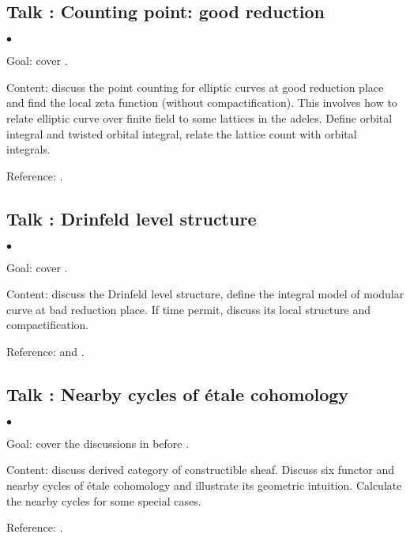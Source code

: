 \documentclass[a4paper, reqno]{amsart} %
\theoremstyle{definition}
\numberwithin{equation}{section}
\newenvironment{altitemize}
	{\begin{list}
			{$\bullet$}
			{\setlength{\labelwidth}{0pt}
				\setlength{\itemindent}{5pt}
				\setlength{\labelsep}{5pt}
				\setlength{\leftmargin}{0pt}
				\setlength{\itemsep}{\the\smallskipamount}
		}}
		{\end{list}}
\begin{document}
\subsection{Talk : Counting point: good reduction}
\begin{altitemize}
\item[Goal:] cover \cite[\S 5]{Scholze-MC}.
\item[Content:] discuss the point counting for elliptic curves at good reduction place and find the local zeta function (without compactification). This involves how to relate elliptic curve over finite field to some lattices in the adeles. 
Define orbital integral and twisted orbital integral, relate the lattice count with orbital integrals.
\item[Reference:] \cite[\S 5]{Scholze-MC}.
\end{altitemize}



\subsection{Talk : Drinfeld level structure} 
\begin{altitemize}
\item[Goal:] cover \cite[\S 6]{Scholze-MC}.
\item[Content:] discuss the Drinfeld level structure, define the integral model of modular curve at bad reduction place. If time permit, discuss its local structure and compactification.
\item[Reference:] \cite{Katz-Mazur} and \cite{Huang-Thesis}.
\end{altitemize}


\subsection{Talk : Nearby cycles of \'etale cohomology}
\begin{altitemize}
\item[Goal:] cover the discussions in \cite[\S 8]{Scholze-MC} before \cite[Corollary 8.5]{Scholze-MC}.
\item[Content:] discuss derived category of constructible sheaf. Discuss six functor and nearby cycles of \'etale cohomology and illustrate its geometric intuition.  Calculate the nearby cycles for some special cases. 
\item[Reference:] \cite[\S 2]{RZ82}.
\end{altitemize}
\end{document}
